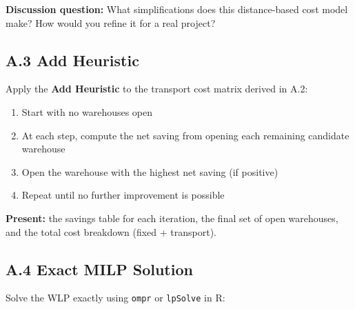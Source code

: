 \documentclass[
  a4paper,
]{article}
\providecommand{\tightlist}{%
  \setlength{\itemsep}{0pt}\setlength{\parskip}{0pt}}
\begin{document}
\textbf{Discussion question:} What simplifications does this
distance-based cost model make? How would you refine it for a real
project?

\subsection{A.3 Add Heuristic}\label{a.3-add-heuristic}

Apply the \textbf{Add Heuristic} to the transport cost matrix derived in
A.2:

\begin{enumerate}
\def\labelenumi{\arabic{enumi}.}
\tightlist
\item
  Start with no warehouses open
\item
  At each step, compute the net saving from opening each remaining
  candidate warehouse
\item
  Open the warehouse with the highest net saving (if positive)
\item
  Repeat until no further improvement is possible
\end{enumerate}

\textbf{Present:} the savings table for each iteration, the final set of
open warehouses, and the total cost breakdown (fixed + transport).

\subsection{A.4 Exact MILP Solution}\label{a.4-exact-milp-solution}

Solve the WLP exactly using \texttt{ompr} or \texttt{lpSolve} in R:
\end{document}
